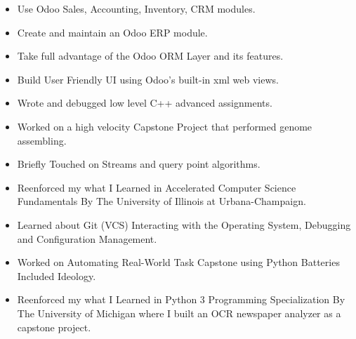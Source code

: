 \documentclass[10pt,a4paper,ragged2e,withhyper]{altacv}
\begin{document}
\begin{paracol}{2}


   \begin{itemize}
      \item Use Odoo Sales, Accounting, Inventory, CRM modules.
      \item Create and maintain an Odoo ERP module.
      \item Take full advantage of the Odoo ORM Layer and its features.
      \item Build User Friendly UI using Odoo's built-in xml web views.
   \end{itemize}

   \divider

   \begin{itemize}
      \item Wrote and debugged low level C++ advanced assignments.
      \item Worked on a high velocity Capstone Project that performed genome assembling. 
      \item Briefly Touched on Streams and query point algorithms.
      \item Reenforced my what I Learned in Accelerated Computer Science Fundamentals By The University of Illinois at Urbana-Champaign.
   \end{itemize}

   \divider

   \begin{itemize}
      \item Learned about Git (VCS) Interacting with the Operating System, Debugging and Configuration Management. 
      \item Worked on Automating Real-World Task Capstone using Python Batteries Included Ideology.
      \item Reenforced my what I Learned in Python 3 Programming Specialization By The University of Michigan where I built an OCR newspaper analyzer as a capstone project.
   \end{itemize}
   \divider



\end{paracol}
\end{document}
